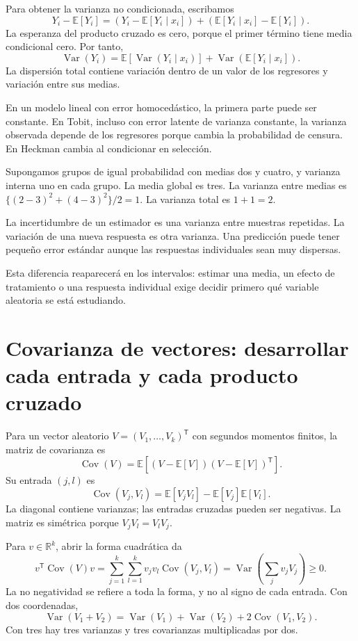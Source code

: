 \documentclass[11pt,a4paper]{article}
\newcommand{\E}{\mathbb E}
\newcommand{\T}{^{\mathsf T}}
\DeclareMathOperator{\Var}{Var}
\DeclareMathOperator{\Cov}{Cov}
\begin{document}
Para obtener la varianza no condicionada, escribamos
\[
Y_i-\E[Y_i]
=(Y_i-\E[Y_i\mid x_i])
+(\E[Y_i\mid x_i]-\E[Y_i]).
\]
La esperanza del producto cruzado es cero,
porque el primer término tiene media condicional cero.
Por tanto,
\[
\Var(Y_i)
=\E[\Var(Y_i\mid x_i)]
+\Var(\E[Y_i\mid x_i]).
\]
La dispersión total contiene variación dentro de un
valor de los regresores y variación entre sus medias.

En un modelo lineal con error homocedástico,
la primera parte puede ser constante.
En Tobit, incluso con error latente de varianza constante,
la varianza observada depende de los regresores
porque cambia la probabilidad de censura.
En Heckman cambia al condicionar en selección.

\begin{ejemplo}
Supongamos grupos de igual probabilidad con medias
dos y cuatro, y varianza interna uno en cada grupo.
La media global es tres.
La varianza entre medias es
\(\{(2-3)^2+(4-3)^2\}/2=1\).
La varianza total es \(1+1=2\).
\end{ejemplo}
La incertidumbre de un estimador es una varianza
entre muestras repetidas.
La variación de una nueva respuesta es otra varianza.
Una predicción puede tener pequeño error estándar
aunque las respuestas individuales sean muy dispersas.

Esta diferencia reaparecerá en los intervalos:
estimar una media, un efecto de tratamiento o
una respuesta individual exige decidir primero
qué variable aleatoria se está estudiando.

\clearpage
\section{Covarianza de vectores: desarrollar cada entrada y cada producto cruzado}\label{unidad5}
Para un vector aleatorio \(V=(V_1,\ldots,V_k)\T\)
con segundos momentos finitos, la matriz de covarianza es
\[
\Cov(V)=\E[(V-\E[V])(V-\E[V])\T].
\]
Su entrada \((j,l)\) es
\[
\Cov(V_j,V_l)=\E[V_jV_l]-\E[V_j]\E[V_l].
\]
La diagonal contiene varianzas; las entradas cruzadas
pueden ser negativas.
La matriz es simétrica porque \(V_jV_l=V_lV_j\).

Para \(v\in\mathbb R^k\), abrir la forma cuadrática da
\[
v\T\Cov(V)v
=\sum_{j=1}^k\sum_{l=1}^k v_jv_l\Cov(V_j,V_l)
=\Var\left(\sum_jv_jV_j\right)\ge0.
\]
La no negatividad se refiere a toda la forma,
y no al signo de cada entrada.
Con dos coordenadas,
\[
\Var(V_1+V_2)=\Var(V_1)+\Var(V_2)+2\Cov(V_1,V_2).
\]
Con tres hay tres varianzas y tres covarianzas
multiplicadas por dos.
\end{document}
